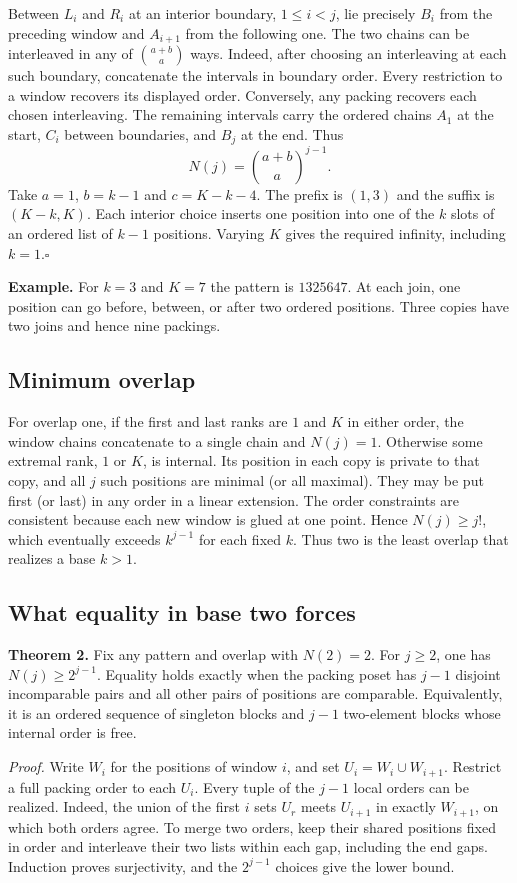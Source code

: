 \documentclass[11pt]{article}
\newcommand{\done}{\hfill\(\square\)}
\begin{document}
Between $L_i$ and $R_i$ at an interior boundary, $1\le i<j$, lie precisely $B_i$ from the preceding window and $A_{i+1}$ from the following one. The two chains can be interleaved in any of $\binom{a+b}{a}$ ways. Indeed, after choosing an interleaving at each such boundary, concatenate the intervals in boundary order. Every restriction to a window recovers its displayed order. Conversely, any packing recovers each chosen interleaving. The remaining intervals carry the ordered chains $A_1$ at the start, $C_i$ between boundaries, and $B_j$ at the end. Thus
\[
                    N(j)=\binom{a+b}{a}^{j-1}.
\]
Take $a=1$, $b=k-1$ and $c=K-k-4$. The prefix is $(1,3)$ and the suffix is $(K-k,K)$. Each interior choice inserts one position into one of the $k$ slots of an ordered list of $k-1$ positions. Varying $K$ gives the required infinity, including $k=1$.\done

\textbf{Example.} For $k=3$ and $K=7$ the pattern is $1325647$. At each join, one position can go before, between, or after two ordered positions. Three copies have two joins and hence nine packings.

\newpage
\subsection*{Minimum overlap}
For overlap one, if the first and last ranks are $1$ and $K$ in either order, the window chains concatenate to a single chain and $N(j)=1$. Otherwise some extremal rank, $1$ or $K$, is internal. Its position in each copy is private to that copy, and all $j$ such positions are minimal (or all maximal). They may be put first (or last) in any order in a linear extension. The order constraints are consistent because each new window is glued at one point. Hence $N(j)\ge j!$, which eventually exceeds $k^{j-1}$ for each fixed $k$. Thus two is the least overlap that realizes a base $k>1$.

\subsection*{What equality in base two forces}
\textbf{Theorem 2.}
Fix any pattern and overlap with $N(2)=2$. For $j\ge2$, one has $N(j)\ge2^{j-1}$. Equality holds exactly when the packing poset has $j-1$ disjoint incomparable pairs and all other pairs of positions are comparable. Equivalently, it is an ordered sequence of singleton blocks and $j-1$ two-element blocks whose internal order is free.

\textit{Proof.}
Write $W_i$ for the positions of window $i$, and set $U_i=W_i\cup W_{i+1}$. Restrict a full packing order to each $U_i$. Every tuple of the $j-1$ local orders can be realized. Indeed, the union of the first $i$ sets $U_r$ meets $U_{i+1}$ in exactly $W_{i+1}$, on which both orders agree. To merge two orders, keep their shared positions fixed in order and interleave their two lists within each gap, including the end gaps. Induction proves surjectivity, and the $2^{j-1}$ choices give the lower bound.
\end{document}
